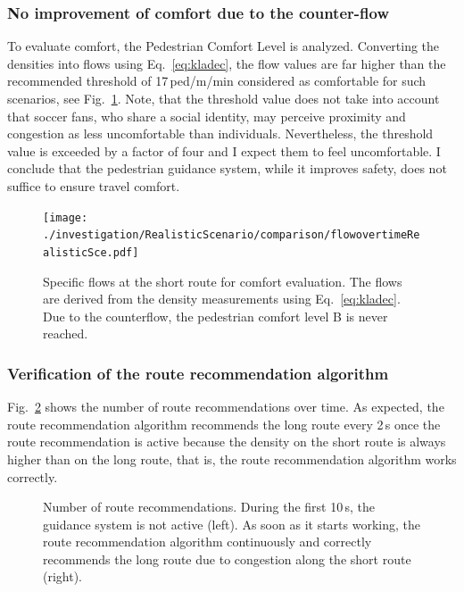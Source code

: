 \subsubsection{No improvement of comfort due to the counter-flow}

To evaluate comfort, the Pedestrian Comfort Level is analyzed. Converting the densities into flows using Eq.~\eqref{eq:kladec}, the flow values are far higher than the recommended threshold of 17\,ped/m/min considered as comfortable for such scenarios, see Fig.~\ref{fig:comfort}.  Note, that the threshold value does not take into account that soccer fans, who share a social identity, may perceive proximity and congestion as less uncomfortable than individuals. Nevertheless, the threshold value is exceeded by a factor of four and I expect them to feel uncomfortable. I conclude that the pedestrian guidance system, while it improves safety, does not suffice to ensure travel comfort.

\begin{figure}[H]
\texttt{[image: ./investigation/RealisticScenario/comparison/flowovertimeRealisticSce.pdf]} 
\caption[Specific flows at the short route] {Specific flows at the short route for comfort evaluation. The flows are derived from the density measurements using Eq.~\eqref{eq:kladec}. Due to the counterflow, the pedestrian comfort level B is never reached. }
\label{fig:comfort}
\end{figure}







\subsubsection{Verification of the route recommendation algorithm}
Fig.~\ref{fig:numberRecommRealistic} shows the number of route recommendations over time.
As expected, the route recommendation algorithm recommends the long route every 2\,s once the route recommendation is active because the density on the short route is always higher than on the long route, that is, the route recommendation algorithm works correctly.

\begin{figure}[H]
\centering
{}
\caption[Number of route recommendations]{Number of route recommendations. During the first 10\,s, the guidance system is not active (left). As soon as it starts working, the route recommendation algorithm continuously and correctly recommends the long route due to congestion along the short route (right). }
\label{fig:numberRecommRealistic}
\end{figure}

